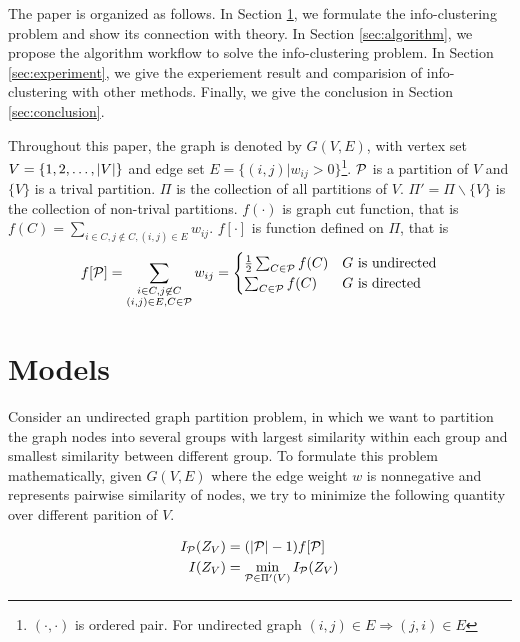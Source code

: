 \documentclass{article}
\begin{document}
The paper is organized as follows. In Section \ref{sec:models}, we formulate the info-clustering problem and show its connection with theory. In Section \ref{sec:algorithm}, we propose the algorithm workflow to solve the info-clustering problem. In Section \ref{sec:experiment}, we give the experiement result and comparision of info-clustering with other methods. Finally, we give the conclusion in Section \ref{sec:conclusion}.

Throughout this paper, the graph is denoted by $G(V,E)$, with vertex set $V = \{1, 2, \dots, \abs{V}\}$ and edge set $E=\{(i,j) | w_{ij}>0\}$\footnote{$(\cdot, \cdot)$ is ordered pair. For undirected graph $(i,j) \in E \Rightarrow (j,i) \in E$}. $\P$ is a partition of $V$ and $\{V\}$ is a trival partition. $\Pi$ is the collection of all partitions of $V$. $\Pi' = \Pi \backslash \{V\}$ is the collection of non-trival partitions. $f(\cdot)$ is graph cut function, that is $f(C) = \sum_{i\in C, j\not\in C, (i,j) \in E} w_{ij}$. $f[\cdot]$ is function defined on $\Pi$, that is
\begin{equation}
f[\P] = \sum_{\substack{i\in C, j \not\in C\\ (i,j)\in E, C\in \mathcal{P}}} w_{ij} =
\begin{cases}
\frac{1}{2} \sum_{C\in \P}f(C)   & G \textrm{ is undirected} \\
\sum_{C\in \P}f(C)   & G \textrm{ is directed}
\end{cases}
\end{equation}
\section{Models}\label{sec:models}

Consider an undirected graph partition problem, in which we want to partition the graph nodes into several groups with largest similarity within each group and smallest similarity between different group. To formulate this problem mathematically, given $G(V, E)$ where the edge weight $w$ is nonnegative and represents pairwise similarity of nodes, we try to minimize the following quantity over different parition of $V$.
\begin{definition}\label{def:ms}
\begin{align}
I_{\P}(Z_V) & = { ( \abs{\mathcal{P}} - 1) } f[\P]\\
I(Z_V) & = \min_{\mathcal{P} \in \Pi'(V)} I_{\mathcal{P}}(Z_V)  \label{eq:ms}
\end{align}
\end{definition}
\end{document}
